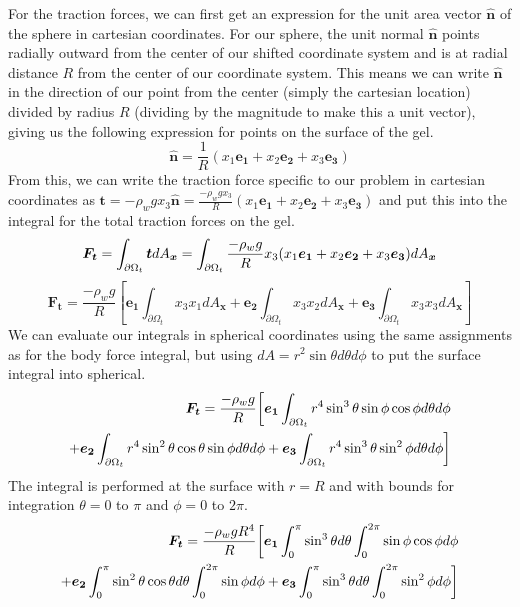 \documentclass[preprint,12pt,authoryear]{elsarticle}
\begin{document}
For the traction forces, we can first get an expression for the unit area vector $\bm{\hat{n}}$ of the sphere in cartesian coordinates. For our sphere, the unit normal $\bm{\hat{n}}$ points radially outward from the center of our shifted coordinate system and is at radial distance $R$ from the center of our coordinate system. This means we can write $\bm{\hat{n}}$ in the direction of our point from the center (simply the cartesian location) divided by radius $R$ (dividing by the magnitude to make this a unit vector), giving us the following expression for points on the surface of the gel.
\begin{equation}
    \bm{\hat{n}} = \frac{1}{R}(x_1\bm{e_1} + x_2\bm{e_2} + x_3\bm{e_3})
\end{equation}
From this, we can write the traction force specific to our problem in cartesian coordinates as $\bm{t} = -\rho_w g x_3 \hat{\bm{n}} = \frac{-\rho_w g x_3}{R}(x_1\bm{e_1} + x_2\bm{e_2} + x_3\bm{e_3})$ and put this into the integral for the total traction forces on the gel.
\begin{equation}
    \bm{F_t} = \int_{\partial \Omega_t}\bm{t} \space dA_{\bm{x}} = \int_{\partial \Omega_t} \frac{-\rho_w g}{R}x_3(x_1\bm{e_1} + x_2\bm{e_2} + x_3\bm{e_3}) \space dA_{\bm{x}}
\end{equation}
\begin{equation}
    \bm{F_t} = \frac{-\rho_w g}{R} \left[ \bm{e_1} \int_{\partial \Omega_t}x_3x_1 dA_{\bm{x}} + \bm{e_2} \int_{\partial \Omega_t}x_3x_2 dA_{\bm{x}} + \bm{e_3} \int_{\partial \Omega_t}x_3x_3 dA_{\bm{x}} \right]
\end{equation}
We can evaluate our integrals in spherical coordinates using the same assignments as for the body force integral, but using $dA = r^2 \sin{\theta}d\theta d\phi$ to put the surface integral into spherical.
\begin{equation}
\begin{split}
    \bm{F_t} = \frac{-\rho_w g}{R} \biggr[ \bm{e_1} \int_{\partial \Omega_t}r^4 \sin^3{\theta}\sin{\phi}\cos{\phi} \space d\theta d\phi  \\  + \bm{e_2} \int_{\partial \Omega_t} r^4 \sin^2{\theta}\cos{\theta}\sin{\phi} \space d\theta d\phi + \bm{e_3} \int_{\partial \Omega_t} r^4 \sin^3{\theta}\sin^2{\phi} \space d\theta d\phi \biggr]
\end{split}
\end{equation}
The integral is performed at the surface with $r=R$ and with bounds for integration $\theta=0$ to $\pi$ and $\phi = 0$ to $2\pi$.
\begin{equation}
\begin{split}
    \bm{F_t} = \frac{-\rho_w g R^4}{R} \biggr[ \bm{e_1} \int_{0}^{\pi} \sin^3{\theta} \space d\theta \int_{0}^{2\pi}\sin{\phi}\cos{\phi} \space d\phi \\
    + \bm{e_2} \int_{0}^{\pi} \sin^2{\theta}\cos{\theta} \space d\theta\int_{0}^{2 \pi}\sin{\phi} \space d\phi + \bm{e_3} \int_{0}^{\pi}\sin^3{\theta} \space d\theta \int_{0}^{2\pi} \sin^2{\phi} \space d\phi \biggr]
    \end{split}
\end{equation}
\end{document}
